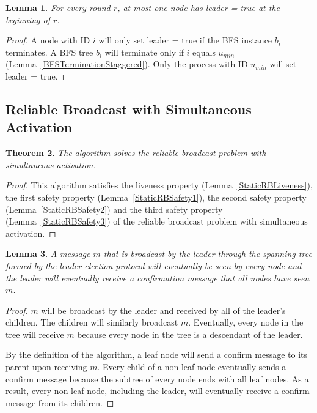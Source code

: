 \documentclass[english]{article}
\newtheorem{theorem}{Theorem}[section]
\newtheorem{lemma}[theorem]{Lemma}
\begin{document}
\begin{lemma}
\label{LESafetyStaggered}
For every round $r$, at most one node has leader = true at the beginning of $r$.
\end{lemma}
\begin{proof}
A node with ID $i$ will only set leader = true if the BFS instance $b_i$ terminates.
A BFS tree $b_i$ will terminate only if $i$ equals $u_{min}$ (Lemma~\ref{BFSTerminationStaggered}).
Only the process with ID $u_{min}$ will set leader = true. 
\end{proof}



\subsection {Reliable Broadcast with Simultaneous Activation}

\begin{theorem}
\label{StaticReliableBroadcast}
The algorithm solves the reliable broadcast problem with simultaneous activation.
\end{theorem}
\begin{proof}
This algorithm satisfies the liveness property (Lemma~\ref{StaticRBLiveness}), 
the first safety property (Lemma~\ref{StaticRBSafety1}),
the second safety property (Lemma~\ref{StaticRBSafety2}) and 
the third safety property (Lemma~\ref{StaticRBSafety3}) of the reliable broadcast problem with simultaneous activation.
\end{proof}


\begin{lemma}
\label{StaticSpanningTree}
A message $m$ that is broadcast by the leader through the spanning tree formed by the leader election protocol will eventually be seen by every node and the leader will eventually receive a confirmation message that all nodes have seen $m$.
\end{lemma}
\begin{proof}

$m$ will be broadcast by the leader and received by all of the leader's children. The children will similarly broadcast $m$. Eventually, every node in the tree will receive $m$ because every node in the tree is a descendant of the leader. 

By the definition of the algorithm, a leaf node will send a confirm message to its parent upon receiving $m$. Every child of a non-leaf node eventually sends a confirm message because the subtree of every node ends with all leaf nodes. As a result, every non-leaf node, including the leader, will eventually receive a confirm message from its children.

\end{proof}
\end{document}
